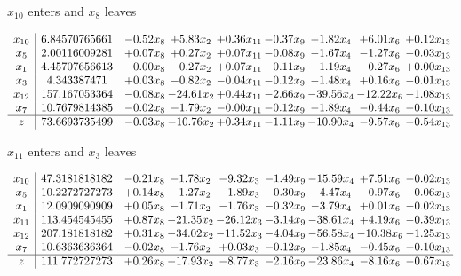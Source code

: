 \documentclass[8pt]{article}
\begin{document}
 $ x_{10} $ enters and $ x_{8} $ leaves 

 \[\begin{array}{c| c c@{\hskip 2pt} c@{\hskip 2pt} c@{\hskip 2pt} c@{\hskip 2pt} c@{\hskip 2pt} c@{\hskip 2pt} c@{\hskip 2pt} }
 x_{10}   &  6.84570765661 & -0.52 x_{8} & +  5.83 x_{2} & +  0.36 x_{11} & -0.37 x_{9} & -1.82 x_{4} & +  6.01 x_{6} & +  0.12 x_{13}\\
 x_{5}   &  2.00116009281 & +  0.07 x_{8} & +  0.27 x_{2} & +  0.07 x_{11} & -0.08 x_{9} & -1.67 x_{4} & -1.27 x_{6} & -0.03 x_{13}\\
 x_{1}   &  4.45707656613 & -0.00 x_{8} & -0.27 x_{2} & +  0.07 x_{11} & -0.11 x_{9} & -1.19 x_{4} & -0.27 x_{6} & +  0.00 x_{13}\\
 x_{3}   &  4.343387471 & +  0.03 x_{8} & -0.82 x_{2} & -0.04 x_{11} & -0.12 x_{9} & -1.48 x_{4} & +  0.16 x_{6} & -0.01 x_{13}\\
 x_{12}   &  157.167053364 & -0.08 x_{8} & -24.61 x_{2} & +  0.44 x_{11} & -2.66 x_{9} & -39.56 x_{4} & -12.22 x_{6} & -1.08 x_{13}\\
 x_{7}   &  10.7679814385 & -0.02 x_{8} & -1.79 x_{2} & -0.00 x_{11} & -0.12 x_{9} & -1.89 x_{4} & -0.44 x_{6} & -0.10 x_{13}\\
\hline
z    &  73.6693735499 & -0.03 x_{8} & -10.76 x_{2} & +  0.34 x_{11} & -1.11 x_{9} & -10.90 x_{4} & -9.57 x_{6} & -0.54 x_{13}\\
\end{array}\]


 $ x_{11} $ enters and $ x_{3} $ leaves 

 \[\begin{array}{c| c c@{\hskip 2pt} c@{\hskip 2pt} c@{\hskip 2pt} c@{\hskip 2pt} c@{\hskip 2pt} c@{\hskip 2pt} c@{\hskip 2pt} }
 x_{10}   &  47.3181818182 & -0.21 x_{8} & -1.78 x_{2} & -9.32 x_{3} & -1.49 x_{9} & -15.59 x_{4} & +  7.51 x_{6} & -0.02 x_{13}\\
 x_{5}   &  10.2272727273 & +  0.14 x_{8} & -1.27 x_{2} & -1.89 x_{3} & -0.30 x_{9} & -4.47 x_{4} & -0.97 x_{6} & -0.06 x_{13}\\
 x_{1}   &  12.0909090909 & +  0.05 x_{8} & -1.71 x_{2} & -1.76 x_{3} & -0.32 x_{9} & -3.79 x_{4} & +  0.01 x_{6} & -0.02 x_{13}\\
 x_{11}   &  113.454545455 & +  0.87 x_{8} & -21.35 x_{2} & -26.12 x_{3} & -3.14 x_{9} & -38.61 x_{4} & +  4.19 x_{6} & -0.39 x_{13}\\
 x_{12}   &  207.181818182 & +  0.31 x_{8} & -34.02 x_{2} & -11.52 x_{3} & -4.04 x_{9} & -56.58 x_{4} & -10.38 x_{6} & -1.25 x_{13}\\
 x_{7}   &  10.6363636364 & -0.02 x_{8} & -1.76 x_{2} & +  0.03 x_{3} & -0.12 x_{9} & -1.85 x_{4} & -0.45 x_{6} & -0.10 x_{13}\\
\hline
z    &  111.772727273 & +  0.26 x_{8} & -17.93 x_{2} & -8.77 x_{3} & -2.16 x_{9} & -23.86 x_{4} & -8.16 x_{6} & -0.67 x_{13}\\
\end{array}\]
\end{document}
